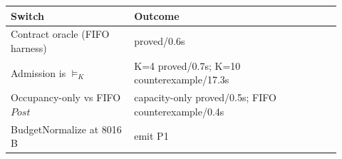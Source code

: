 \begin{center}
\scriptsize
\begin{tabular}{p{0.34\linewidth}p{0.58\linewidth}}
\toprule
Switch & Outcome \\
\midrule
Contract oracle (FIFO harness) & proved/0.6s \\
Admission is $\models_K$ & K=4 proved/0.7s; K=10 counterexample/17.3s \\
Occupancy-only vs FIFO $\mathit{Post}$ & capacity-only proved/0.5s; FIFO counterexample/0.4s \\
BudgetNormalize at 8016\,B & emit P1 \\
\bottomrule
\end{tabular}
\end{center}
